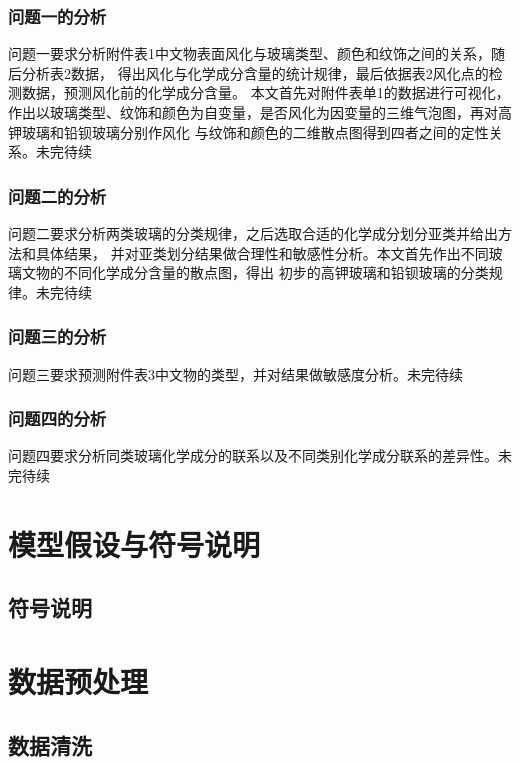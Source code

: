 \documentclass[withoutpreface,bwprint]{cumcmthesis} %
\begin{document}
\subsubsection{问题一的分析}

问题一要求分析附件表1中文物表面风化与玻璃类型、颜色和纹饰之间的关系，随后分析表2数据， 得出风化与化学成分含量的统计规律，最后依据表2风化点的检测数据，预测风化前的化学成分含量。 本文首先对附件表单1的数据进行可视化， 作出以玻璃类型、纹饰和颜色为自变量，是否风化为因变量的三维气泡图，再对高钾玻璃和铅钡玻璃分别作风化 与纹饰和颜色的二维散点图得到四者之间的定性关系。未完待续

\subsubsection{问题二的分析}

问题二要求分析两类玻璃的分类规律，之后选取合适的化学成分划分亚类并给出方法和具体结果， 并对亚类划分结果做合理性和敏感性分析。本文首先作出不同玻璃文物的不同化学成分含量的散点图，得出 初步的高钾玻璃和铅钡玻璃的分类规律。未完待续

\subsubsection{问题三的分析}

问题三要求预测附件表3中文物的类型，并对结果做敏感度分析。未完待续

\subsubsection{问题四的分析}

问题四要求分析同类玻璃化学成分的联系以及不同类别化学成分联系的差异性。未完待续

 
\section{模型假设与符号说明}
\subsection{符号说明}


\section{数据预处理}
\subsection{数据清洗}
\end{document}
